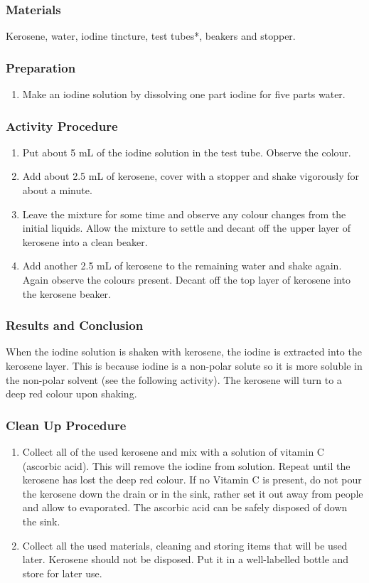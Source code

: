 \subsubsection*{Materials}
Kerosene, water, iodine tincture, test tubes*, beakers and stopper.

\subsubsection*{Preparation}
\begin{enumerate}
\item{Make an iodine solution by dissolving one part iodine for five parts water.}
\end{enumerate}

\subsubsection*{Activity Procedure}
\begin{enumerate}
\item{Put about 5 mL of the iodine solution in the test tube. Observe the colour.}
\item{Add about 2.5 mL of kerosene, cover with a stopper and shake vigorously for about a minute.}
\item{Leave the mixture for some time and observe any colour changes from the initial liquids. Allow the mixture to settle and decant off the upper layer of kerosene into a clean beaker.}
\item{Add another 2.5 mL of kerosene to the remaining water and shake again. Again observe the colours present. Decant off the top layer of kerosene into the kerosene beaker.}
\end{enumerate}

\subsubsection*{Results and Conclusion}
When the iodine solution is shaken with kerosene, the iodine is extracted into the kerosene layer. This is because iodine is a non-polar solute so it is more soluble in the non-polar solvent (see the following activity). The kerosene will turn to a deep red colour upon shaking. 

\subsubsection*{Clean Up Procedure}
\begin{enumerate}
\item{Collect all of the used kerosene and mix with a solution of vitamin C (ascorbic acid). This will remove the iodine from solution. Repeat until the kerosene has lost the deep red colour. If no Vitamin C is present, do not pour the kerosene down the drain or in the sink, rather set it out away from people and allow to evaporated. The ascorbic acid can be safely disposed of down the sink.}
\item{Collect all the used materials, cleaning and storing items that will be used later. Kerosene should not be disposed. Put it in a well-labelled bottle and store for later use.}
\end{enumerate}

